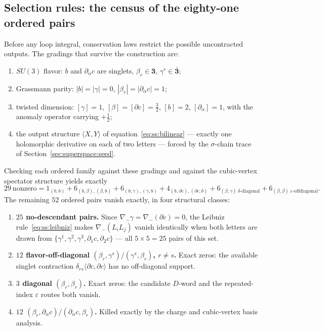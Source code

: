 \subsection{Selection rules: the census of the eighty-one ordered pairs}%
\label{sec:superspace:selection}

Before any loop integral, conservation laws restrict the possible
uncontracted outputs. The gradings that survive the construction are:
\begin{enumerate}[label=(\roman*)]
\item $SU(3)$ flavor: $b$ and $\partial_{\dot\alpha}c$ are singlets,
$\beta_r\in\mathbf 3$, $\gamma^r\in\bar{\mathbf 3}$;
\item Grassmann parity: $|b|=|\gamma|=0$, $|\beta_r|=|\partial_{\dot\alpha}c|=1$;
\item twisted dimension: $[\gamma]=1$, $[\beta]=[\partial c]=\tfrac32$,
$[b]=2$, $[\partial_{\dot\alpha}]=1$, with the anomaly operator carrying
$+\tfrac12$;
\item the output structure $\langle X,Y\rangle$ of
equation~\eqref{eq:ss:bilinear} --- exactly one holomorphic derivative on
each of two letters --- forced by the $\sigma$-chain trace of
Section~\ref{sec:superspace:seed}.
\end{enumerate}
Checking each ordered family against these gradings and against the
cubic-vertex spectator structure yields exactly
\begin{equation}\label{eq:ss:29}
29\ \text{nonzero}
=1_{(b,b)}
+6_{(b,\beta),(\beta,b)}
+6_{(b,\gamma),(\gamma,b)}
+4_{(b,\partial c),(\partial c,b)}
+6_{(\beta,\gamma)\ \delta\text{-diagonal}}
+6_{(\beta,\beta)\ \varepsilon\text{-offdiagonal}} .
\end{equation}
The remaining $52$ ordered pairs vanish exactly, in four structural classes:
\begin{enumerate}
\item \textbf{$25$ no-descendant pairs.} Since
$\nabla_{-}\gamma=\nabla_{-}(\partial c)=0$, the Leibniz
rule~\eqref{eq:ss:leibniz} makes $\nabla_{-}(L_iL_j)$ vanish identically when
both letters are drawn from
$\{\gamma^{1},\gamma^{2},\gamma^{3},\partial_{\dot1}c,\partial_{\dot2}c\}$ ---
all $5\times5=25$ pairs of this set.
\item \textbf{$12$ flavor-off-diagonal $(\beta_r,\gamma^s)/(\gamma^s,\beta_r)$,
$r\ne s$.} Exact zeros: the available singlet contraction
$\delta_{rs}\langle\partial c,\partial c\rangle$ has no off-diagonal support.
\item \textbf{$3$ diagonal $(\beta_r,\beta_r)$.} Exact zeros: the candidate
$D$-word and the repeated-index $\varepsilon$ routes both vanish.
\item \textbf{$12$ $(\beta_r,\partial_{\dot\alpha}c)/(\partial_{\dot\alpha}c,\beta_r)$.}
Killed exactly by the charge and cubic-vertex basis analysis.
\end{enumerate}

